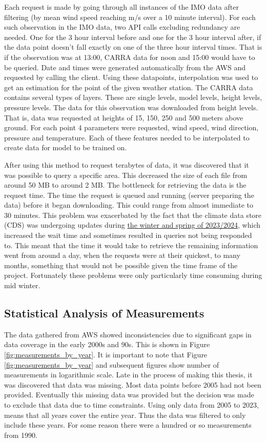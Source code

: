 Each request is made by going through all instances of the IMO data after filtering (by mean wind speed reaching \averageWindSpeedLimit m/s over a 10 minute interval). For each such observation in the IMO data, two API calls excluding redundancy are needed. One for the 3 hour interval before and one for the 3 hour interval after, if the data point doesn't fall exactly on one of the three hour interval times. That is if the observation was at 13:00, CARRA data for noon and 15:00 would have to be queried. Date and times were generated automatically from the AWS and requested by calling the client. Using these datapoints, interpolation was used to get an estimation for the point of the given weather station. The CARRA data contains several types of layers. These are single levels, model levels, height levels, pressure levels. The data for this observation was downloaded from height levels. That is, data was requested at heights of 15, 150, 250 and 500 meters above ground. For each point 4 parameters were requested, wind speed, wind direction, pressure and temperature. Each of these features needed to be interpolated to create data for model to be trained on.

After using this method to request terabytes of data, it was discovered that it was possible to query a specific area. This decreased the size of each file from around 50 MB to around 2 MB. The bottleneck for retrieving the data is the request time. The time the request is queued and running (server preparing the data) before it began downloading. This could range from almost immediate to 30 minutes. This problem was exacerbated by the fact that the climate data store (CDS) was undergoing updates during \href{https://forum.ecmwf.int/t/a-new-cds-soon-to-be-launched-expect-some-disruptions/1607}{the winter and spring of 2023/2024}, which increased the wait time and sometimes resulted in queries not being responded to. This meant that the time it would take to retrieve the remaining information went from around a day, when the requests were at their quickest, to many months, something that would not be possible given the time frame of the project. Fortunately these problems were only particularly time consuming during mid winter.

\subsection{Statistical Analysis of Measurements}
The data gathered from AWS showed inconsistencies due to significant gaps in data coverage in the early 2000s and 90s. This is shown in Figure \ref{fig:measurements_by_year}. It is important to note that Figure \ref{fig:measurements_by_year} and subsequent figures show number of measurements in logarithmic scale. Late in the process of making this thesis, it was discovered that data was missing. Most data points before 2005 had not been provided. Eventually this missing data was provided but the decision was made to exclude that data due to time constraints. Using only data from 2005 to 2023, means that all years cover the entire year. Thus the data was filtered to only include these years. For some reason there were a hundred or so measurements from 1990.

